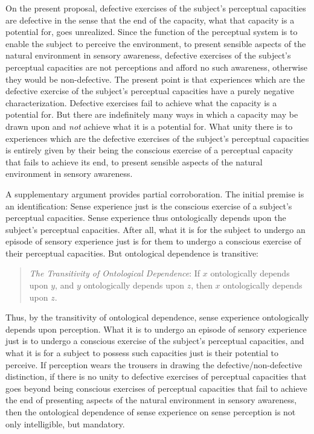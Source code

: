 \documentclass[12pt]{article}
\begin{document}
On the present proposal, defective exercises of the subject's perceptual capacities are defective in the sense that the end of the capacity, what that capacity is a potential for, goes unrealized. Since the function of the perceptual system is to enable the subject to perceive the environment, to present sensible aspects of the natural environment in sensory awareness, defective exercises of the subject's perceptual capacities are not perceptions and afford no such awareness, otherwise they would be non-defective. The present point is that experiences which are the defective exercise of the subject's perceptual capacities have a purely negative characterization. Defective exercises fail to achieve what the capacity is a potential for. But there are indefinitely many ways in which a capacity may be drawn upon and \emph{not} achieve what it is a potential for. What unity there is to experiences which are the defective exercises of the subject's perceptual capacities is entirely given by their being the conscious exercise of a perceptual capacity that fails to achieve its end, to present sensible aspects of the natural environment in sensory awareness. 

A supplementary argument provides partial corroboration. The initial premise is an identification: Sense experience just is the conscious exercise of a subject's perceptual capacities. Sense experience thus ontologically depends upon the subject's perceptual capacities. After all, what it is for the subject to undergo an episode of sensory experience just is for them to undergo a conscious exercise of their perceptual capacities. But ontological dependence is transitive: 
\begin{quote}
	\emph{The Transitivity of Ontological Dependence}: If \( x \) ontologically depends upon \( y \), and \( y \) ontologically depends upon \( z \), then \( x \) ontologically depends upon \( z \). 
\end{quote}
Thus, by the transitivity of ontological dependence, sense experience ontologically depends upon perception. What it is to undergo an episode of sensory experience just is to undergo a conscious exercise of the subject's perceptual capacities, and what it is for a subject to possess such capacities just is their potential to perceive. If perception wears the trousers in drawing the defective/non-defective distinction, if there is no unity to defective exercises of perceptual capacities that goes beyond being conscious exercises of perceptual capacities that fail to achieve the end of presenting aspects of the natural environment in sensory awareness, then the ontological dependence of sense experience on sense perception is not only intelligible, but mandatory.
\end{document}
